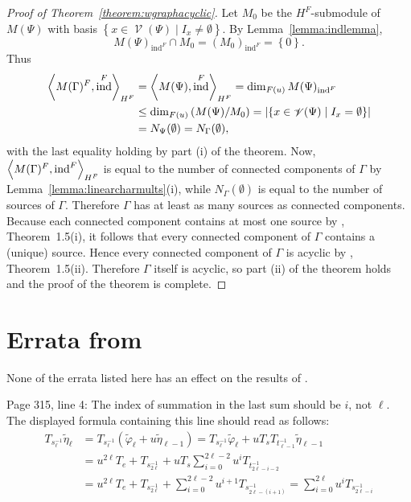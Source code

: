 \documentclass[11pt,leqno]{article}
\theoremstyle{plain}
\theoremstyle{definition}
\numberwithin{subcase}{case}
\numberwithin{subsubcase}{subcase}
\numberwithin{table}{section}
\numberwithin{equation}{section}
\newcommand{\set}[1]{\left\{#1\right\}}
\newcommand{\setof}[2]{\left\{{#1}\mid{#2}\right\}}
\newcommand{\abs}[1]{\left\vert{#1}\right\vert}
\newcommand{\charprod}[3]{\left<{#1},\strut{#2}\right>_{#3}}
\DeclareMathOperator{\ind}{ind}
\DeclareMathOperator{\vertices}{{\mathscr V}}
\begin{document}
\begin{proof}[Proof of Theorem~\ref{theorem:wgraphacyclic}]
Let $M_0$ be the $H^F$-submodule of $M(\Psi)$ 
with basis
$\setof{x \in \vertices(\Psi)}{I_x \ne \emptyset}$.
By Lemma~\ref{lemma:indlemma},  
\[
M(\Psi)_{\ind^F} \cap M_0 
= 
(M_0)_{\ind^F}
=
\set{0}.
\]
Thus
\begin{equation*}
\begin{split}
\charprod{M(\Gamma)^F}{\ind^F}{H^F} 
 & =
\charprod{M(\Psi)}{\ind^F}{H^F} 
 =
\dim_{F(u)} M(\Psi)_{\ind^F} \\
& \le 
\dim_{F(u)} \left( M(\Psi) / M_0 \right) 
 =
\abs{ \setof{ x \in \vertices(\Psi) } {I_x = \emptyset }} \\
& =
N_{\Psi}(\emptyset)
=
N_{\Gamma}(\emptyset),
\end{split}
\end{equation*}
with the last equality holding by part (i) of the theorem.  
Now, 
$\charprod{M(\Gamma)^F}{\ind^F}{H^F}$ is equal to the number of
connected components of $\Gamma$ by
Lemma~\ref{lemma:linearcharmults}(i), while
 $N_\Gamma(\emptyset)$ is equal to 
the number of sources of $\Gamma$. 
Therefore
$\Gamma$ has at least as many
sources as connected components. 
Because each connected component contains
at most one source by \cite{digraphpaper}, Theorem~1.5(i), it follows that 
every connected component of $\Gamma$  contains a 
(unique) source.  Hence every connected component of $\Gamma$
 is acyclic by \cite{digraphpaper}, Theorem~1.5(ii).
Therefore $\Gamma$ itself is acyclic, so part (ii) of the theorem holds and the 
proof of the theorem is complete.
\end{proof}



\section{Errata from \cite{digraphpaper}}
None of the errata listed here has an effect on the results of  \cite{digraphpaper}. 

\medskip\bigskip\noindent Page 315, line 4:  The index of summation in the last sum should be $i$, 
not $\ell$. 
The displayed formula containing this line should read as follows: 
\begin{equation*}
\begin{split}
T_{s_\ell^{-1}} {\widetilde{\eta}}_\ell
& = 
T_{s_\ell^{-1}} ({\widetilde{\varphi}}_\ell + u {\widetilde{\eta}}_{\ell-1}) 
= 
T_{s_\ell^{-1}} {\widetilde{\varphi}}_\ell + u T_s T_{t_{\ell-1}^{-1}} 
     {\widetilde{\eta}}_{\ell-1} \\
& = 
u^{2\ell} T_e + T_{s_{2\ell}^{-1}}
 + u T_s \sum_{i=0}^{2\ell-2} u^{i} T_{t_{2\ell-i-2}^{-1}} \\
& = 
 u^{2\ell} T_e + T_{s_{2\ell}^{-1}} 
   + \sum_{i=0}^{2\ell-2} u^{i+1} T_{s_{2\ell-(i+1)}^{-1}} 
= 
\sum_{i=0}^{2\ell} u^{i} T_{s_{2\ell-i}^{-1}}
\end{split}
\end{equation*}
\end{document}
